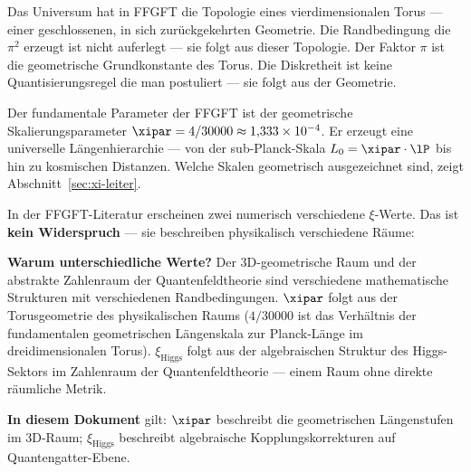 \begin{foundation}
Das Universum hat in FFGFT die Topologie eines vierdimensionalen Torus ---
einer geschlossenen, in sich zurückgekehrten Geometrie.
Die Randbedingung die $\pi^2$ erzeugt ist nicht auferlegt ---
sie folgt aus dieser Topologie. Der Faktor $\pi$ ist die
geometrische Grundkonstante des Torus. Die Diskretheit ist
keine Quantisierungsregel die man postuliert --- sie folgt
aus der Geometrie.

Der fundamentale Parameter der FFGFT ist der geometrische
Skalierungsparameter $\xipar = 4/30000 \approx 1{,}333 \times 10^{-4}$.
Er erzeugt eine universelle Längenhierarchie --- von der
sub-Planck-Skala $L_0 = \xipar \cdot \lP$ bis hin zu kosmischen Distanzen.
Welche Skalen geometrisch ausgezeichnet sind, zeigt
Abschnitt~\ref{sec:xi-leiter}.

\begin{keypoint}
In der FFGFT-Literatur erscheinen zwei numerisch verschiedene $\xi$-Werte.
Das ist \textbf{kein Widerspruch} --- sie beschreiben physikalisch verschiedene Räume:

\begin{center}
\end{center}

\textbf{Warum unterschiedliche Werte?}
Der 3D-geometrische Raum und der abstrakte Zahlenraum der
Quantenfeldtheorie sind verschiedene mathematische Strukturen
mit verschiedenen Randbedingungen.
$\xipar$ folgt aus der Torusgeometrie des physikalischen Raums
($4/30000$ ist das Verhältnis der fundamentalen geometrischen Längenskala
zur Planck-Länge im dreidimensionalen Torus).
$\xi_\text{Higgs}$ folgt aus der algebraischen Struktur des Higgs-Sektors
im Zahlenraum der Quantenfeldtheorie ---
einem Raum ohne direkte räumliche Metrik.

\textbf{In diesem Dokument} gilt: $\xipar$ beschreibt die
geometrischen Längenstufen im 3D-Raum;
$\xi_\text{Higgs}$ beschreibt algebraische Kopplungskorrekturen
auf Quantengatter-Ebene.
\end{keypoint}
\end{foundation}

